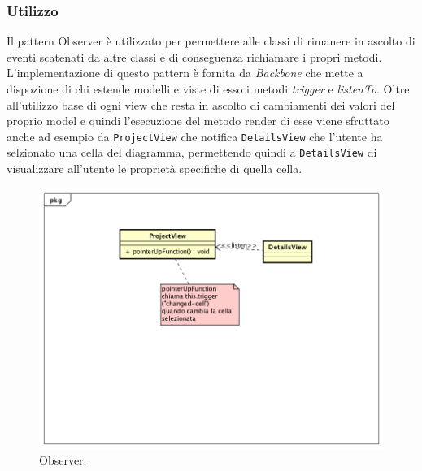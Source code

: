 \subsubsection{Utilizzo}
Il pattern Observer è utilizzato per permettere alle classi di rimanere in ascolto di eventi scatenati da altre classi e di conseguenza richiamare i propri metodi.
L'implementazione di questo pattern è fornita da \emph{Backbone} che mette a dispozione di chi estende modelli e viste di esso i metodi \emph{trigger} e \emph{listenTo}. Oltre all'utilizzo base di ogni view che resta in ascolto di cambiamenti dei valori del proprio model e quindi l'esecuzione del metodo render di esse viene sfruttato anche ad esempio da \texttt{ProjectView} che notifica \texttt{DetailsView} che l'utente ha selzionato una cella del diagramma, permettendo quindi a \texttt{DetailsView} di visualizzare all'utente le proprietà specifiche di quella cella.
\begin{figure}[H] \label{fig:observer}
	\includegraphics[scale=0.45]{img/observerExample.png}
	\caption{Observer.}
\end{figure}